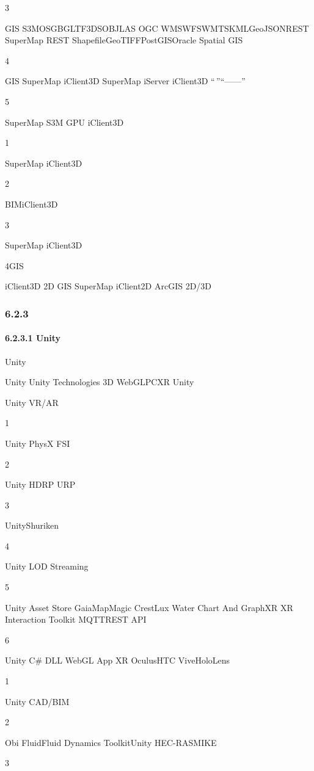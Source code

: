 3

GIS S3MOSGBGLTF3DSOBJLAS OGC WMSWFSWMTSKMLGeoJSONREST SuperMap REST
ShapefileGeoTIFFPostGISOracle Spatial GIS

4

GIS SuperMap iClient3D SuperMap iServer iClient3D ``\,''``------''

5

SuperMap S3M GPU iClient3D

1

SuperMap iClient3D

2

BIMiClient3D

3

SuperMap iClient3D

4GIS

iClient3D 2D GIS SuperMap iClient2D ArcGIS 2D/3D

\hypertarget{section-50}{%
\subsubsection{6.2.3}\label{section-50}}

\hypertarget{unity}{%
\paragraph{6.2.3.1 Unity}\label{unity}}

Unity

Unity Unity Technologies 3D WebGLPCXR Unity

Unity VR/AR

1

Unity PhysX FSI

2

Unity HDRP URP

3

UnityShuriken

4

Unity LOD Streaming

5

Unity Asset Store GaiaMapMagic CrestLux Water Chart And GraphXR XR
Interaction Toolkit MQTTREST API

6

Unity C\# DLL WebGL App XR OculusHTC ViveHoloLens

1

Unity CAD/BIM

2

Obi FluidFluid Dynamics ToolkitUnity HEC-RASMIKE

3

